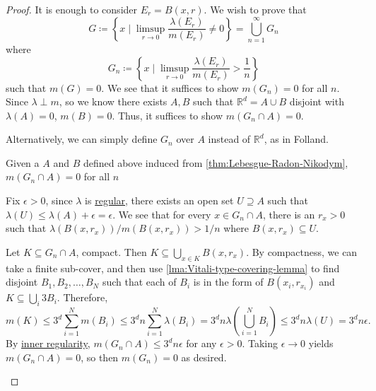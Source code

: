 \begin{proof}
	It is enough to consider \(E_r = B(x,r)\). We wish to prove that
	\[
		G \coloneqq \left\{x \mid \limsup_{r \to 0} \frac{\lambda(E_r)}{m(E_r)} \neq 0\right\}  = \bigcup_{n = 1}^\infty G_n
	\]
	where
	\[
		G_n \coloneqq \left\{x \mid \limsup_{r \to 0} \frac{\lambda(E_r)}{m(E_r)} > \frac{1}{n}\right\}
	\]
	such that \(m(G) = 0\). We see that it suffices to show \(m(G_n) = 0\) for all \(n\). Since \(\lambda \perp m\), so we know there exists \(A, B\) such that
	\(\mathbb{R}^d = A \cup B\) disjoint with \(\lambda(A) = 0\), \(m(B) = 0\). Thus, it suffices to show \(m(G_n \cap A) = 0\).
	\begin{note}
		Alternatively, we can simply define \(G_{n} \) over \(A\) instead of \(\mathbb{R} ^d\), as in Folland\cite{folland1999real}.
	\end{note}

	\begin{claim}
		Given a \(A\) and \(B\) defined above induced from \autoref{thm:Lebesgue-Radon-Nikodym}, \(m(G_n \cap A) = 0\) for all \(n\)
	\end{claim}
	\begin{explanation}
		Fix \(\epsilon> 0\), since \(\lambda\) is \hyperref[def:regular]{regular}, there exists an open set \(U \supseteq A\) such that \(\lambda(U) \leq \lambda(A) + \epsilon= \epsilon \).
		We see that for every \(x \in G_n \cap A\), there is an \(r_x > 0\) such that \(\lambda(B(x,r_x))/m(B(x,r_x)) > 1/n\) where \(B(x,r_x) \subseteq U\).

		Let \(K \subseteq G_n \cap A\), compact. Then \(K \subseteq \bigcup_{x \in K} B(x,r_x)\). By compactness, we can take a finite sub-cover, and then use
		\autoref{lma:Vitali-type-covering-lemma} to find  disjoint \(B_1,B_2,\dots,B_N\) such that each of \(B_{i} \) is in the form of \(B(x_i,r_{x_i})\) and
		\(K \subseteq \bigcup_i 3B_i\). Therefore,
		\[
			m(K) \leq 3^d \sum_{i=1}^N m(B_i) \leq 3^dn\sum_{i=1}^N \lambda(B_i) = 3^d n\lambda\left( \bigcup_{i=1}^N B_i \right) \leq 3^dn\lambda(U) = 3^dn \epsilon .
		\]
		By \hyperref[thm:inner-regularity]{inner regularity}, \(m(G_n \cap A) \leq 3^d n\epsilon\) for any \(\epsilon> 0\). Taking \(\epsilon\to 0\) yields \(m(G_n \cap A) = 0\), so then \(m(G_n) = 0\) as desired.
	\end{explanation}
\end{proof}
